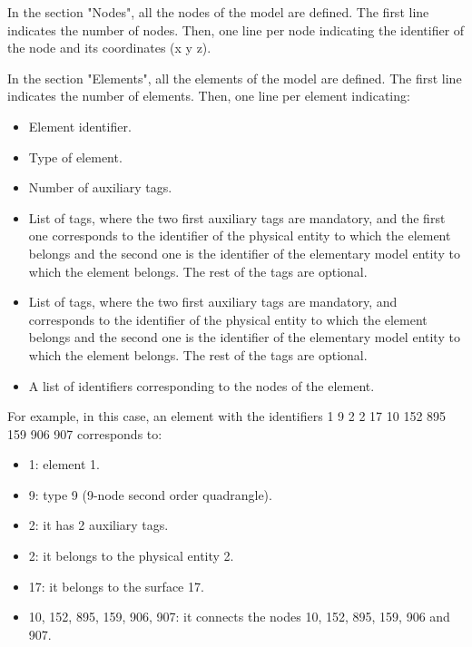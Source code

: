 \documentclass[a4]{article}
\begin{document}
In the section "Nodes", all the nodes of the model are defined. The first line indicates the number of nodes. Then, one line per node indicating the identifier of the node and its coordinates (x y z).

In the section "Elements", all the elements of the model are defined. The first line indicates the number of elements. Then, one line per element indicating:

\begin{itemize}
	\item Element identifier.
	\item Type of element.
	\item Number of auxiliary tags.
	\item List of tags, where the two first auxiliary tags are mandatory, and the first one corresponds to the identifier of the physical entity to which the element belongs and the second one is the identifier of the elementary model entity to which the element belongs. The rest of the tags are optional.
	\item List of tags, where the two first auxiliary tags are mandatory, and corresponds to the identifier of the physical entity to which the element belongs and the second one is the identifier of the elementary model entity to which the element belongs. The rest of the tags are optional.
	\item A list of identifiers corresponding to the nodes of the element.
\end{itemize}

For example, in this case, an element with the identifiers 1 9 2 2 17 10 152 895 159 906 907 corresponds to:

\begin{itemize}
	\item 1: element 1.
	\item 9: type 9 (9-node second order quadrangle).
	\item 2: it has 2 auxiliary tags.
	\item 2: it belongs to the physical entity 2.
	\item 17: it belongs to the surface 17.
	\item 10, 152, 895, 159, 906, 907: it connects the nodes 10, 152, 895, 159, 906 and 907.
\end{itemize} 
\end{document}
